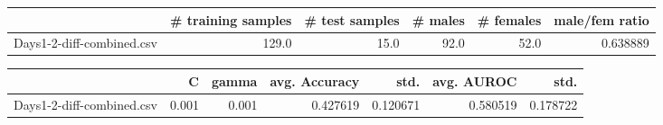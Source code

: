 \begin{tabular}{lrrrrr}
\hline
{} &  \# training samples &  \# test samples &  \# males &  \# females &  male/fem ratio \\
\hline
Days1-2-diff-combined.csv &               129.0 &            15.0 &     92.0 &       52.0 &        0.638889 \\
\hline
\end{tabular}
\begin{tabular}{lrrrrrr}
\hline
{} &      C &  gamma &  avg. Accuracy &      std. &  avg. AUROC &      std. \\
\hline
Days1-2-diff-combined.csv &  0.001 &  0.001 &       0.427619 &  0.120671 &    0.580519 &  0.178722 \\
\hline
\end{tabular}
